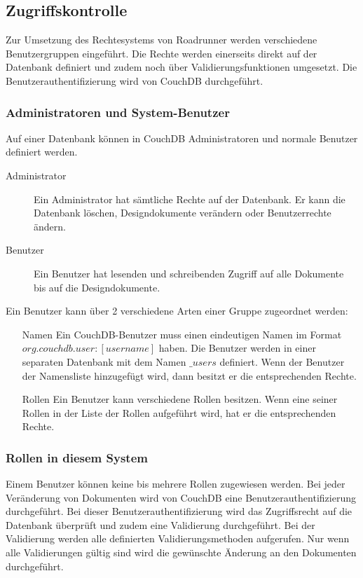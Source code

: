 \subsection{Zugriffskontrolle}

Zur Umsetzung des Rechtesystems von Roadrunner werden verschiedene Benutzergruppen
	eingeführt. Die Rechte werden einerseits direkt auf der Datenbank definiert und
	zudem noch über Validierungsfunktionen umgesetzt. Die Benutzerauthentifizierung
	wird von CouchDB durchgeführt.

\subsubsection{Administratoren und System-Benutzer}

Auf einer Datenbank können in CouchDB Administratoren und normale Benutzer definiert
	werden.
	
\begin{description}
	\item[Administrator] Ein Administrator hat sämtliche Rechte auf der Datenbank.
		Er kann die Datenbank löschen, Designdokumente verändern oder
		Benutzerrechte ändern.
	\item[Benutzer] Ein Benutzer hat lesenden und schreibenden Zugriff auf
		alle Dokumente bis auf die Designdokumente.
\end{description}

\noindent Ein Benutzer kann über 2 verschiedene Arten einer Gruppe zugeordnet werden:

\begin{itemize}
	\item[Namen] Ein CouchDB-Benutzer muss einen eindeutigen Namen im Format
		$org.couchdb.user:[username]$ haben. Die Benutzer werden in einer separaten
		Datenbank mit dem Namen $\_users$ definiert. Wenn der Benutzer der Namensliste
		hinzugefügt wird, dann besitzt er die entsprechenden Rechte.
		
	\item[Rollen] Ein Benutzer kann verschiedene Rollen besitzen. Wenn eine seiner
		Rollen in der Liste der Rollen aufgeführt wird, hat er die entsprechenden
		Rechte.
\end{itemize}

\subsubsection{Rollen in diesem System}

Einem Benutzer können keine bis mehrere Rollen zugewiesen werden. Bei jeder Veränderung
	von Dokumenten wird von CouchDB eine Benutzerauthentifizierung
	durchgeführt. Bei dieser Benutzerauthentifizierung wird das Zugriffsrecht auf die
	Datenbank überprüft und zudem eine Validierung durchgeführt. Bei der Validierung
	werden alle definierten Validierungsmethoden aufgerufen. Nur wenn alle Validierungen
	gültig sind wird die gewünschte Änderung an den Dokumenten durchgeführt.
	
